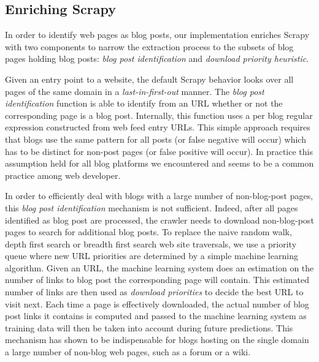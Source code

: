 \subsection{Enriching Scrapy}\label{enrichingscrapy}
In order to identify web pages as blog posts, our implementation enriches Scrapy with two components to narrow the extraction process to the subsets of blog pages holding blog posts: \emph{blog post identification} and \emph{download priority heuristic}.

Given an entry point to a website, the default Scrapy behavior looks over all pages of the same domain in a \emph{last-in-first-out} manner. The \emph{blog post identification} function is able to identify from an URL whether or not the corresponding page is a blog post. Internally, this function uses a per blog regular expression constructed from web feed entry URLs. This simple approach requires that blogs use the same pattern for all posts (or false negative will occur) which has to be distinct for non-post pages (or false positive will occur). In practice this assumption held for all blog platforms we encountered and seems to be a common practice among web developer.

In order to efficiently deal with blogs with a large number of non-blog-post pages, this \emph{blog post identification} mechanism is not sufficient. Indeed, after all pages identified as blog post are processed, the crawler needs to download non-blog-post pages to search for additional blog posts. To replace the naive random walk, depth first search or breadth first search web site traversals, we use a priority queue where new URL priorities are determined by a simple machine learning algorithm. Given an URL, the machine learning system does an estimation on the number of links to blog post the corresponding page will contain. This estimated number of links are then used as \emph{download priorities} to decide the best URL to visit next. Each time a page is effectively downloaded, the actual number of blog post links it contains is computed and passed to the machine learning system as training data will then be taken into account during future predictions. This mechanism has shown to be indispensable for blogs hosting on the single domain a large number of non-blog web pages, such as a forum or a wiki.


